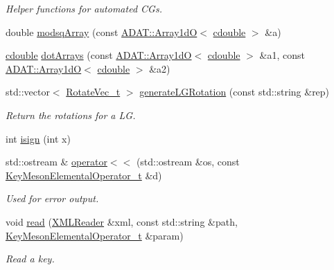\begin{DoxyCompactItemize}
\begin{DoxyCompactList}\small\item\em Helper functions for automated C\+Gs. \end{DoxyCompactList}\item 
double \mbox{\hyperlink{namespaceHadron_a05c9899cc82acc7112a4df5dab534ee4}{modsq\+Array}} (const \mbox{\hyperlink{classADAT_1_1Array1dO}{A\+D\+A\+T\+::\+Array1dO}}$<$ \mbox{\hyperlink{namespaceHadron_abaab2f90393b8dd8d93060e6ce6568e7}{cdouble}} $>$ \&a)
\item 
\mbox{\hyperlink{namespaceHadron_abaab2f90393b8dd8d93060e6ce6568e7}{cdouble}} \mbox{\hyperlink{namespaceHadron_aad081d14cd95160e164751fe86cff3af}{dot\+Arrays}} (const \mbox{\hyperlink{classADAT_1_1Array1dO}{A\+D\+A\+T\+::\+Array1dO}}$<$ \mbox{\hyperlink{namespaceHadron_abaab2f90393b8dd8d93060e6ce6568e7}{cdouble}} $>$ \&a1, const \mbox{\hyperlink{classADAT_1_1Array1dO}{A\+D\+A\+T\+::\+Array1dO}}$<$ \mbox{\hyperlink{namespaceHadron_abaab2f90393b8dd8d93060e6ce6568e7}{cdouble}} $>$ \&a2)
\item 
std\+::vector$<$ \mbox{\hyperlink{structHadron_1_1RotateVec__t}{Rotate\+Vec\+\_\+t}} $>$ \mbox{\hyperlink{namespaceHadron_a4467e73143184e2935f0f0f0e31079bc}{generate\+L\+G\+Rotation}} (const std\+::string \&rep)
\begin{DoxyCompactList}\small\item\em Return the rotations for a LG. \end{DoxyCompactList}\item 
int \mbox{\hyperlink{namespaceHadron_ab7c3962155ebb71e6377424d11c29daa}{isign}} (int x)
\item 
std\+::ostream \& \mbox{\hyperlink{namespaceHadron_a24d0db7f972f8d517641ad9235bfa33c}{operator$<$$<$}} (std\+::ostream \&os, const \mbox{\hyperlink{structHadron_1_1KeyMesonElementalOperator__t}{Key\+Meson\+Elemental\+Operator\+\_\+t}} \&d)
\begin{DoxyCompactList}\small\item\em Used for error output. \end{DoxyCompactList}\item 
void \mbox{\hyperlink{namespaceHadron_adde6149254919751c9f0e1b2b12c4d17}{read}} (\mbox{\hyperlink{classADATXML_1_1XMLReader}{X\+M\+L\+Reader}} \&xml, const std\+::string \&path, \mbox{\hyperlink{structHadron_1_1KeyMesonElementalOperator__t}{Key\+Meson\+Elemental\+Operator\+\_\+t}} \&param)
\begin{DoxyCompactList}\small\item\em Read a key. \end{DoxyCompactList}\item 

\end{DoxyCompactItemize}
